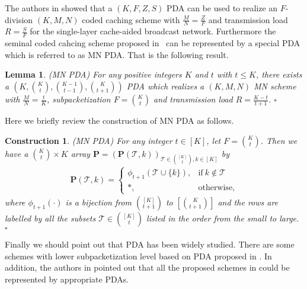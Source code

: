 \documentclass[onecolumn,10pt]{IEEEtran}
\theoremstyle{mythm}
\newtheorem{lemma}{Lemma}
\newtheorem{construction}{Construction}
\begin{document}
The authors in \cite{YCTC} showed that a $(K,F,Z,S)$ PDA can be used to realize an $F$-division $(K,M,N)$ coded caching scheme with $\frac{M}{N}=\frac{Z}{F}$ and transmission load $R=\frac{S}{F}$ for the single-layer cache-aided broadcast network. Furthermore the seminal coded cahcing scheme proposed in~\cite{MN} can be represented by a special PDA which is referred to as MN PDA. That is the following result.
\begin{lemma}\rm(MN PDA\cite{MN})
\label{le-MN}
For any positive integers $K$ and $t$ with $t\leq K$, there exists a   $\left(K,{K\choose t},{K-1\choose t-1},{K\choose t+1}\right)$ PDA which realizes a $(K,M,N)$ MN scheme with $\frac{M}{N}=\frac{t}{K}$, subpacketization $F={K\choose t}$ and transmission load $R=\frac{K-t}{t+1}$.
\hfill $\square$
\end{lemma}
Here we briefly review the construction of MN PDA as follows.
\begin{construction}\rm (MN PDA\cite{MN})
\label{con-MN} For any integer $t\in[K]$, let $F={K\choose t}$. Then we have a ${K\choose t}\times K$ array $\mathbf{P}=\left(\mathbf{P}(\mathcal{T},k)\right)_{\mathcal{T}\in {[K]\choose t}, k\in [K]}$ by
\begin{align}\label{Eqn_Def_AN}
\mathbf{P}(\mathcal{T},k)=\left\{\begin{array}{cc}
\phi_{t+1}(\mathcal{T}\cup\{k\}), & \mbox{if}~k\notin\mathcal{T}\\
*, & \mbox{otherwise},
\end{array}
\right.
\end{align}
where $\phi_{t+1}(\cdot)$ is a bijection from  $\binom{[K]}{t+1}$ to $[\binom{K}{t+1}]$ and the rows are labelled by all the subsets $\mathcal{T}\in {[K]\choose t}$ listed in the order from the small to large.
\hfill $\square$
\end{construction}

Finally we should point out that PDA has been widely studied. There are some schemes with lower subpacketization level based on PDA proposed in \cite{YCTC,CJYT,CJWY,CWZW,WCWG,MJW,ZCJ,ZCW,CWLZG,SSRS}. In addition, the authors in \cite{SKTADA} pointed out that all the proposed schemes in \cite{TR,SZG,STD,YTCC,KP} could be represented by appropriate PDAs.
\end{document}
